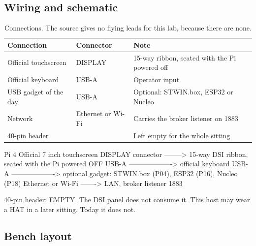 \subsection*{Wiring and schematic}


\begin{table}[H]\centering\small
\begin{tabular}{p{42mm}p{30mm}p{80mm}}
\toprule
Connection & Connector & Note \\
\midrule
Official touchscreen & DISPLAY & 15-way ribbon, seated with the Pi powered off \\
Official keyboard & USB-A & Operator input \\
USB gadget of the day & USB-A & Optional: STWIN.box, ESP32 or Nucleo \\
Network & Ethernet or Wi-Fi & Carries the broker listener on 1883 \\
40-pin header & & Left empty for the whole sitting \\
\bottomrule
\end{tabular}
\caption{Connections. The source gives no flying leads for this lab, because there are none.}
\end{table}

\begin{asciiart}
Pi 4                          Official 7 inch touchscreen
DISPLAY connector -------->   15-way DSI ribbon, seated with the Pi powered OFF
USB-A ------------------->    official keyboard
USB-A ------------------->    optional gadget: STWIN.box (P04), ESP32 (P16), Nucleo (P18)
Ethernet or Wi-Fi ------->    LAN, broker listener 1883

40-pin header:  EMPTY.  The DSI panel does not consume it.
                This host may wear a HAT in a later sitting. Today it does not.
\end{asciiart}

\subsection*{Bench layout}


